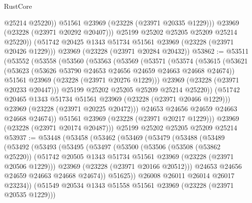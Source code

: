 \begin{lexlean}{RustCore}
\begin{coremodule}
                @25214
                @25220))
            @51561
            @23969
            (@23228 (@23971 @20335 @1229)))
          @23969
          (@23228 (@23971 @20292 @20407)))
        @25199
        @25202
        @25205
        @25209
        @25214
        @25220))
    (@51742 @20425 @1343 @51734 @51561 @23969 (@23228 (@23971 @20426 @1229)))
    @23969
    (@23228 (@23971 @20284 @20432))
@53862 := @53511
    (@53552
      (@53558
        (@53560
          (@53563
            (@53569
              (@53571
                (@53574
                  (@53615
                    (@53621
                      (@53623 (@53626 @53790 @24653 @24656 @24659 @24663 @24668 @24674))
                      @51561
                      @23969
                      (@23228 (@23971 @20276 @1229)))
                    @23969
                    (@23228 (@23971 @20233 @20447)))
                  @25199
                  @25202
                  @25205
                  @25209
                  @25214
                  @25220))
              (@51742 @20465 @1343 @51734 @51561 @23969 (@23228 (@23971 @20466 @1229)))
              @23969
              (@23228 (@23971 @20225 @20472)))
            @24653
            @24656
            @24659
            @24663
            @24668
            @24674))
        @51561
        @23969
        (@23228 (@23971 @20217 @1229)))
      @23969
      (@23228 (@23971 @20174 @20487)))
    @25199
    @25202
    @25205
    @25209
    @25214
@53937 := @53448
    (@53458
      (@53462
        (@53469
          (@53479
            (@53488
              (@53489
                (@53492
                  (@53493
                    (@53495
                      (@53497
                        (@53500
                          (@53506
                            (@53508 (@53862 @25220))
                            (@51742
                              @20505
                              @1343
                              @51734
                              @51561
                              @23969
                              (@23228 (@23971 @20506 @1229)))
                            @23969
                            (@23228 (@23971 @20166 @20512)))
                          @24653
                          @24656
                          @24659
                          @24663
                          @24668
                          @24674))
                      @51625))
                  @26008
                  @26011
                  @26014
                  @26017
                  @23234))
              (@51549 @20534 @1343 @51558 @51561 @23969 (@23228 (@23971 @20535 @1229)))

\end{coremodule}
\end{lexlean}
